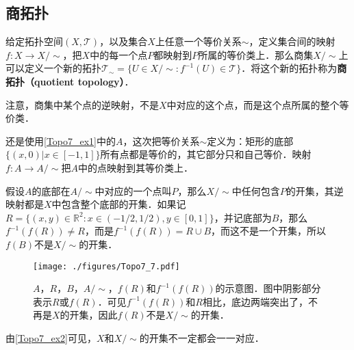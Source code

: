 \subsection{商拓扑}

给定拓扑空间$(X, \mathcal{T})$，以及集合$X$上任意一个等价关系$\sim$，定义集合间的映射$f:X\rightarrow X/\sim$，把$X$中的每一个点$P$都映射到$P$所属的等价类上．那么商集$X/\sim$上可以定义一个新的拓扑$\mathcal{T}_\sim=\{U\in X/\sim: f^{-1}(U)\in\mathcal{T}\}$．将这个新的拓扑称为\textbf{商拓扑（quotient topology）}．

注意，商集中某个点的逆映射，不是$X$中对应的这个点，而是这个点所属的整个等价类．

\begin{example}{}\label{Topo7_ex2}

还是使用\autoref{Topo7_ex1}中的$A$，这次把等价关系$\sim$定义为：矩形的底部$\{(x,0)|x\in[-1,1]\}$所有点都是等价的，其它部分只和自己等价．映射$f:A\rightarrow A/\sim$把$A$中的点映射到其等价类上．

假设$A$的底部在$A/\sim$中对应的一个点叫$P$，那么$X/\sim$中任何包含$P$的开集，其逆映射都是$X$中包含整个底部的开集．如果记$R=\{(x,y)\in\mathbb{R}^2:x\in(-1/2,1/2),y\in[0,1]\}$，并记底部为$B$，那么$f^{-1}(f(R))\not=R$，而是$f^{-1}(f(R))=R\cup B$，而这不是一个开集，所以$f(B)$不是$X/\sim$的开集．


\begin{figure}[ht]
\centering
\texttt{[image: ./figures/Topo7\_7.pdf]}
\caption{$A$，$R$，$B$，$A/\sim$，$f(R)$和$f^{-1}(f(R))$的示意图．图中阴影部分表示$R$或$f(R)$．可见$f^{-1}(f(R))$和$R$相比，底边两端突出了，不再是$X$的开集，因此$f(R)$不是$X/\sim$的开集．} \label{Topo7_fig7}
\end{figure}

\end{example}

由\autoref{Topo7_ex2}可见，$X$和$X/\sim$的开集不一定都会一一对应．

